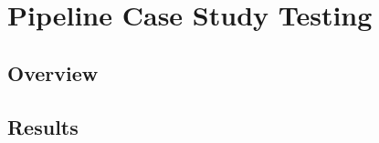 \chapter{Pipeline Case Study Testing}
\label{chap:sysValidation}

\section{Overview} \label{sec:sysVal.overview}



\section{Results} \label{sec:sysVal.results}








